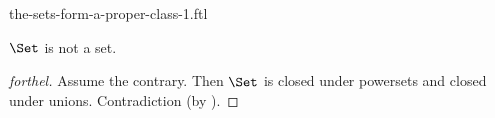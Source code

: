 \documentclass{naproche-library}
\begin{document}
\begin{smodule}[title=The Sets Form a Proper Class]{the-sets-form-a-proper-class-1.ftl}

\begin{proposition}[forthel,id=hilbert_paradox_corollary]
  $\Set$ is not a set.
\end{proposition}
\begin{proof}[forthel]
  Assume the contrary.
  Then $\Set$ is closed under powersets and closed under unions.
  Contradiction (by ).
\end{proof}
\end{smodule}
\end{document}
